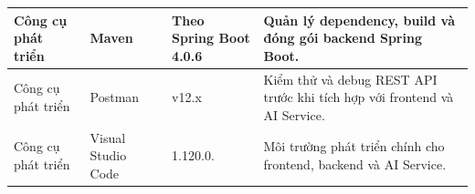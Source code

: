 \begin{longtable}{|p{2.6cm}|p{3.1cm}|p{2.4cm}|p{6.3cm}|}
Công cụ phát triển 
& Maven 
& Theo Spring Boot 4.0.6
& Quản lý dependency, build và đóng gói backend Spring Boot. \\
\hline

Công cụ phát triển 
& Postman 
& v12.x
& Kiểm thử và debug REST API trước khi tích hợp với frontend và AI Service. \\
\hline

Công cụ phát triển 
& Visual Studio Code 
& 1.120.0.
& Môi trường phát triển chính cho frontend, backend và AI Service. \\
\hline

\end{longtable}

\normalsize

